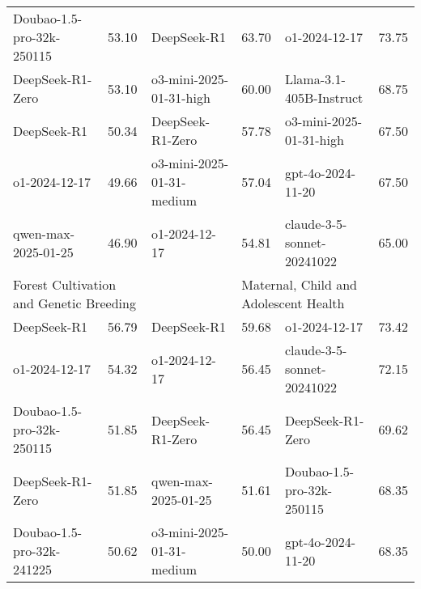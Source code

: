 {\begin{longtable}{p{4.2cm}>{\centering\arraybackslash} p{0.8cm}|p{4.2cm} >{\centering\arraybackslash} p{0.8cm}|p{4.2cm} >{\centering\arraybackslash} p{0.8cm}}
\hline
\cellcolor{teal!5} Doubao-1.5-pro-32k-250115 & \cellcolor{teal!2}53.10 & \cellcolor{blue!5} DeepSeek-R1 & \cellcolor{blue!2} 63.70 & \cellcolor{yellow!5} o1-2024-12-17 & \cellcolor{yellow!2} 73.75\\
\cellcolor{teal!5} DeepSeek-R1-Zero & \cellcolor{teal!2}53.10 & \cellcolor{blue!5} o3-mini-2025-01-31-high & \cellcolor{blue!2} 60.00 & \cellcolor{yellow!5} Llama-3.1-405B-Instruct & \cellcolor{yellow!2} 68.75\\
\cellcolor{teal!5} DeepSeek-R1 & \cellcolor{teal!2}50.34 & \cellcolor{blue!5} DeepSeek-R1-Zero & \cellcolor{blue!2} 57.78 & \cellcolor{yellow!5} o3-mini-2025-01-31-high & \cellcolor{yellow!2} 67.50\\
\cellcolor{teal!5} o1-2024-12-17 & \cellcolor{teal!2}49.66 & \cellcolor{blue!5} o3-mini-2025-01-31-medium & \cellcolor{blue!2} 57.04 & \cellcolor{yellow!5} gpt-4o-2024-11-20 & \cellcolor{yellow!2} 67.50\\
\cellcolor{teal!5} qwen-max-2025-01-25 & \cellcolor{teal!2}46.90 & \cellcolor{blue!5} o1-2024-12-17 & \cellcolor{blue!2} 54.81 & \cellcolor{yellow!5} claude-3-5-sonnet-20241022 & \cellcolor{yellow!2} 65.00\\
\hline
\multicolumn{2}{p{5.15cm}|}{\cellcolor{teal!10} \centering Forest Cultivation and Genetic Breeding} & \multicolumn{2}{p{5.15cm}|}{\cellcolor{blue!10} \centering Oil and Gas Field Development and Storage \& Transportation Engineering} & \multicolumn{2}{p{5.15cm}}{\cellcolor{yellow!10} \centering Maternal, Child and Adolescent Health}\\
\hline
\cellcolor{teal!5} DeepSeek-R1 & \cellcolor{teal!2}56.79 & \cellcolor{blue!5} DeepSeek-R1 & \cellcolor{blue!2} 59.68 & \cellcolor{yellow!5} o1-2024-12-17 & \cellcolor{yellow!2} 73.42\\
\cellcolor{teal!5} o1-2024-12-17 & \cellcolor{teal!2}54.32 & \cellcolor{blue!5} o1-2024-12-17 & \cellcolor{blue!2} 56.45 & \cellcolor{yellow!5} claude-3-5-sonnet-20241022 & \cellcolor{yellow!2} 72.15\\
\cellcolor{teal!5} Doubao-1.5-pro-32k-250115 & \cellcolor{teal!2}51.85 & \cellcolor{blue!5} DeepSeek-R1-Zero & \cellcolor{blue!2} 56.45 & \cellcolor{yellow!5} DeepSeek-R1-Zero & \cellcolor{yellow!2} 69.62\\
\cellcolor{teal!5} DeepSeek-R1-Zero & \cellcolor{teal!2}51.85 & \cellcolor{blue!5} qwen-max-2025-01-25 & \cellcolor{blue!2} 51.61 & \cellcolor{yellow!5} Doubao-1.5-pro-32k-250115 & \cellcolor{yellow!2} 68.35\\
\cellcolor{teal!5} Doubao-1.5-pro-32k-241225 & \cellcolor{teal!2}50.62 & \cellcolor{blue!5} o3-mini-2025-01-31-medium & \cellcolor{blue!2} 50.00 & \cellcolor{yellow!5} gpt-4o-2024-11-20 & \cellcolor{yellow!2} 68.35\\

\end{longtable}}
